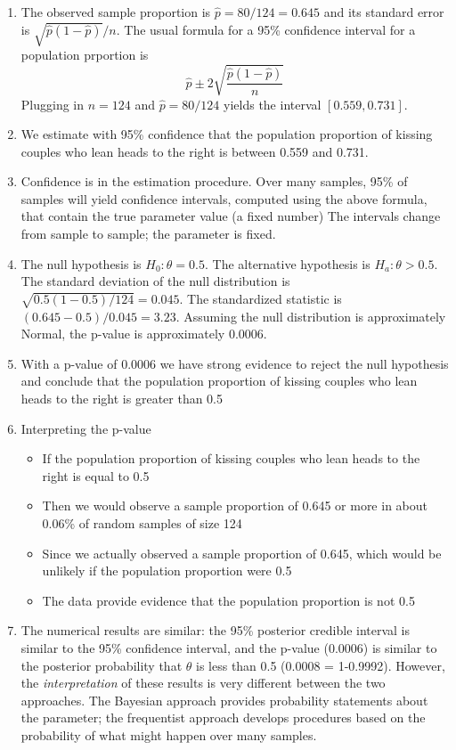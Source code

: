 \documentclass[
]{book}
\providecommand{\tightlist}{%
  \setlength{\itemsep}{0pt}\setlength{\parskip}{0pt}}
\theoremstyle{definition}
\theoremstyle{definition}
\theoremstyle{definition}
\theoremstyle{remark}
\begin{document}
\begin{enumerate}
\def\labelenumi{\arabic{enumi}.}
\item
  The observed sample proportion is \(\hat{p} = 80/124 = 0.645\) and its standard error is \(\sqrt{\hat{p}(1-\hat{p})}/n\). The usual formula for a 95\% confidence interval for a population prportion is
  \[
    \hat{p} \pm 2\sqrt{\frac{\hat{p}(1-\hat{p})}{n}}
  \]
  Plugging in \(n=124\) and \(\hat{p} = 80/124\) yields the interval \([0.559, 0.731]\).
\item
  We estimate with 95\% confidence that the population proportion of kissing couples who lean heads to the right is between 0.559 and 0.731.
\item
  Confidence is in the estimation procedure.
  Over many samples, 95\% of samples will yield confidence intervals, computed using the above formula, that contain the true parameter value (a fixed number)
  The intervals change from sample to sample; the parameter is fixed.
\item
  The null hypothesis is \(H_0:\theta = 0.5\). The alternative hypothesis is \(H_a:\theta>0.5\). The standard deviation of the null distribution is \(\sqrt{0.5(1-0.5)/124} = 0.045\). The standardized statistic is \((0.645 - 0.5) / 0.045 = 3.23\). Assuming the null distribution is approximately Normal, the p-value is approximately 0.0006.
\item
  With a p-value of 0.0006 we have strong evidence to reject the null hypothesis and conclude that the population proportion of kissing couples who lean heads to the right is greater than 0.5
\item
  Interpreting the p-value

  \begin{itemize}
  \tightlist
  \item
    If the population proportion of kissing couples who lean heads to the right is equal to 0.5
  \item
    Then we would observe a sample proportion of 0.645 or more in about 0.06\% of random samples of size 124
  \item
    Since we actually observed a sample proportion of 0.645, which would be unlikely if the population proportion were 0.5
  \item
    The data provide evidence that the population proportion is not 0.5
  \end{itemize}
\item
  The numerical results are similar: the 95\% posterior credible interval is similar to the 95\% confidence interval, and the p-value (0.0006) is similar to the posterior probability that \(\theta\) is less than 0.5 (0.0008 = 1-0.9992). However, the \emph{interpretation} of these results is very different between the two approaches. The Bayesian approach provides probability statements about the parameter; the frequentist approach develops procedures based on the probability of what might happen over many samples.
\end{enumerate}
\end{document}
